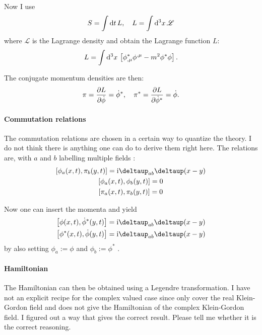 \documentclass[11pt, english, fleqn, DIV=15, headinclude, BCOR=1cm]{scrartcl}
\begin{document}
Now I use
\begin{equation}
    S = \int \mathop{}\!\mathrm d t \, L
    ,\quad
    L = \int \mathop{}\!\mathrm d^3 x \, \mathscr L
\end{equation}
where $\mathscr L$ is the Lagrange density and obtain the Lagrange function
$L$:
\begin{equation}
    L = \int \mathop{}\!\mathrm d^3 x \, \left[ 
        \phi^*_{,\mu} \phi^{,\mu} - m^2 \phi^* \phi
     \right].
\end{equation}

The conjugate momentum densities are then:
\begin{equation}
    \pi = \frac{\partial {L}}{\partial {\dot \phi}} = \dot \phi^{*}
    ,\quad
    \pi^* = \frac{\partial {L}}{\partial {\dot \phi^*}} = \dot \phi.
\end{equation}

\paragraph{Commutation relations}

The commutation relations are chosen in a certain way to quantize the theory. I
do not think there is anything one can do to derive them right here. The
relations are, with $a$ and $b$ labelling multiple fields
\parencite[(12.3.1)]{Schwabl/Quantenmechanik_fuer_Fortgeschrittene/2008}:
\begin{gather*}
    \sbr{\phi_a(x, t), \pi_b(y, t)} = \iup \deltaup_{ab} \deltaup(x - y) \\
    \sbr{\phi_a(x, t), \phi_b(y, t)} = 0 \\
    \sbr{\pi_a(x, t), \pi_b(y, t)} = 0
\end{gather*}

Now one can insert the momenta and yield
\begin{gather*}
    \sbr{\phi(x, t), \dot\phi^*(y, t)} = \iup \deltaup_{ab} \deltaup(x - y) \\
    \sbr{\phi^*(x, t), \dot\phi(y, t)} = \iup \deltaup_{ab} \deltaup(x - y)
\end{gather*}
by also setting $\phi_a := \phi$ and $\phi_b := \phi^*$
\parencite[(13.2.4)]{Schwabl/Quantenmechanik_fuer_Fortgeschrittene/2008}.

\paragraph{Hamiltonian}

The Hamiltonian can then be obtained using a Legendre transformation. I have
not an explicit recipe for the complex valued case since
\textcite[Chapter~2]{Peskin/QFT/1995} only cover the real Klein-Gordon field
and \textcite[Chapter~13.2]{Schwabl/Quantenmechanik_fuer_Fortgeschrittene/2008}
does not give the Hamiltonian of the complex Klein-Gordon field. I figured out
a way that gives the correct result. Please tell me whether it is the correct
reasoning.
\end{document}
